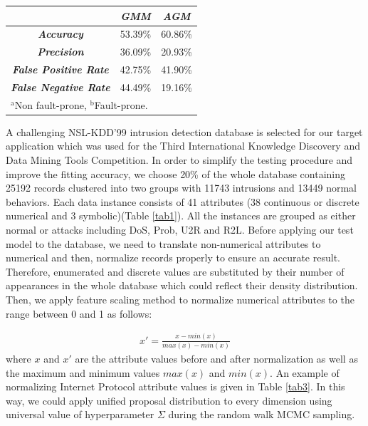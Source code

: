 \documentclass[conference]{IEEEtran}
\begin{document}
\begin{table}[b]
\begin{center}
\begin{tabular}{|c|c|c|}
\hline
 & \multicolumn{1}{|p{1.5cm}|}{\centering \textbf{\textit{GMM}}} & \multicolumn{1}{|p{1.5cm}|}{\centering \textbf{\textit{AGM}}}\\
\hline
\multicolumn{1}{|p{2.5cm}|}{\centering \textbf{\textit{Accuracy}}}  & 53.39\% & 60.86\%\\
\multicolumn{1}{|p{2.5cm}|}{\centering \textbf{\textit{Precision}}} & 36.09\% & 20.93\%\\
\multicolumn{1}{|p{2.5cm}|}{\centering \textbf{\textit{False Positive Rate}}}  & 42.75\% & 41.90\%\\
\multicolumn{1}{|p{2.5cm}|}{\centering \textbf{\textit{False Negative Rate}}} & 44.49\% & 19.16\%\\
\hline
\multicolumn{3}{l}{$^{\mathrm{a}}$Non fault-prone, $^{\mathrm{b}}$Fault-prone.}
\end{tabular}
\end{center}
\label{tab5}
\end{table}

A challenging NSL-KDD'99 intrusion detection database\cite{Tavallaee2009} is selected for our target application which was used for the Third International Knowledge Discovery and Data Mining Tools Competition. In order to simplify the testing procedure and improve the fitting accuracy, we choose 20\% of the whole database containing 25192 records clustered into two groups with 11743 intrusions and 13449 normal behaviors. Each data instance consists of 41 attributes (38 continuous or discrete numerical and 3 symbolic)(Table \ref{tab1}). All the instances are grouped as either normal or attacks including DoS, Prob, U2R and R2L. Before applying our test model to the database, we need to translate non-numerical attributes to numerical and then, normalize records properly to ensure an accurate result. Therefore, enumerated and discrete values are substituted by their number of appearances in the whole database which could reflect their density distribution. Then, we apply feature scaling method to normalize numerical attributes to the range between 0 and 1 as follows: 

\begin{align}
x' = \frac{x - min(x)}{max(x) - min(x)}
\label{eq:normalize}
\end{align}
where $x$ and $x'$ are the attribute values before and after normalization as well as the maximum and minimum values $max(x)$  and $min(x)$. An example of normalizing Internet Protocol attribute values is given in Table \ref{tab3}. In this way, we could apply unified proposal distribution to every dimension using universal value of hyperparameter $\Sigma$ during the random walk MCMC sampling.
\end{document}
